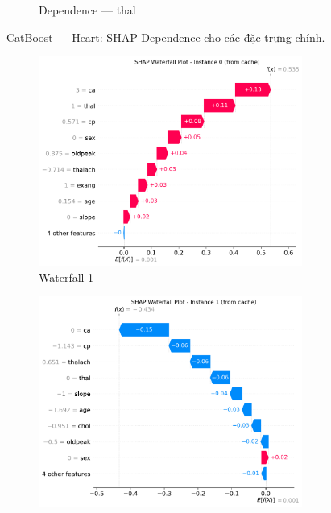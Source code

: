 \begin{figure}[H]
\begin{subfigure}[b]{0.31\textwidth}
\caption{Dependence — thal}
\label{fig:cat_heart_dep_thal}
\end{subfigure}
\caption{CatBoost — Heart: SHAP Dependence cho các đặc trưng chính.}
\label{fig:cat_heart_dependences}
\end{figure}

\begin{figure}[H]
\centering
\begin{subfigure}[b]{0.31\textwidth}
\centering
\includegraphics[width=0.95\textwidth]{Result/heart_dataset/Catboost/SHAP/Waterfall 1.png}
\caption{Waterfall 1}
\label{fig:cat_heart_waterfall1}
\end{subfigure}\hfill
\begin{subfigure}[b]{0.31\textwidth}
\centering
\includegraphics[width=0.95\textwidth]{Result/heart_dataset/Catboost/SHAP/Waterfall 2.png}

\end{subfigure}
\end{figure}
